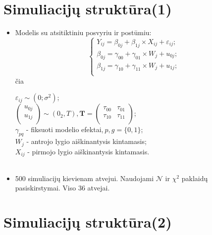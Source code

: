 \documentclass[12pt,a4paper]{article}
\begin{document}
\section{Simuliacijų struktūra(1)}
\begin{itemize}
\item Modelis su atsitiktiniu posvyriu ir postūmiu:
\begin{equation*} \label{eq:2lvldelpish}
\left\{
\begin{array}{l}
Y_{ij} = \beta_{0j}+ \beta_{1j}\times X_{ij}+\varepsilon_{ij}; \\
\beta_{0j} = \gamma_{00} +\gamma_{01}\times W_{j}+u_{0j};\\
\beta_{1j} = \gamma_{10} +\gamma_{11}\times W_{j}+u_{1j};\\
\end{array} \right.
\end{equation*}
čia \\
\begin{small}
$\varepsilon_{ij}\sim \left(0;\sigma^2\right)$;\\
$\begin{pmatrix}
u_{0j} \\
u_{1j} \\
\end{pmatrix}\sim \left(0_2, T\right), \mathbf{T}=\begin{pmatrix}
\tau_{00} & \tau_{01} \\
\tau_{10} & \tau_{11} \\
\end{pmatrix}$; \\
$\gamma_{pq}$ - fiksuoti modelio efektai,$\ p,g = \{0,1\}$;\\
$W_j$ - antrojo lygio aiškinantysis kintamasis;\\
$X_{ij}$ - pirmojo lygio aiškinantysis kintamasis.\\ 
\ \\
\end{small}
\item 500 simuliacijų kievienam atvejui. Naudojami $\mathcal{N}$ ir $\chi^2$ paklaidų pasiskirstymai. Viso 36 atvejai.
\end{itemize}

\section{Simuliacijų struktūra(2)}
\end{document}
